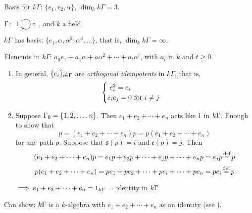 Basis for $k\Gamma$: $\{ e_1, e_2, \alpha\}$, $\dim_kk\Gamma = 3$.

\begin{exam}
$\Gamma\colon \xymatrix{1\ar@(ur,dr)[]^\alpha}$, and $k$ a field.

$k\Gamma$ has basis: $\{e_1, \alpha, \alpha^2, \alpha^3, \ldots\}$,
that is, $\dim_k k\Gamma = \infty$. 

Elements in $k\Gamma$: $a_0e_1 + a_1\alpha + a\alpha^2 + \cdots +
a_t\alpha^t$, with $a_i$ in $k$ and $t\geqslant 0$.  
\end{exam}

\begin{note}
\begin{enumerate}
\item In general, $\{e_i\}_{i \in \Gamma}$ are \emph{orthogonal
    idempotents} in $k\Gamma$, that is, 
	\[ \begin{cases}\text{\ $e_i^2 = e_i$}\notag\\
	\text{$e_ie_j = 0$ for $i\neq j$}\notag
	\end{cases}\]
	
    \item Suppose $\Gamma_0 = \{1,2,\ldots,n\}$. Then $e_1 + e_2 + \cdots + e_n$
      acts like 1 in $k\Gamma$. Enough to show that
      \[p = (e_1 + e_2 + \cdots + e_n)p = p(e_1 + e_2 + \cdots +
        e_n)\] 
      for any path $p$. Suppose that $\mathfrak{s}(p) = i$ and
      $\mathfrak{e}(p) = j$. Then 
      \[(e_1 + e_2 + \cdots + e_n)p = e_1p + e_2p + \cdots + e_jp + \cdots +
      e_np = e_jp \defeq p\]
      \[p(e_1 + e_2 + \cdots + e_n) = pe_1 + pe_2 + \cdots + pe_i + \cdots +
      pe_n = pe_i \defeq p\]
	
    $\implies e_1 + e_2 + \cdots + e_n = 1_{k\Gamma}$ = identity in $k\Gamma$
\end{enumerate}
Can show: $k\Gamma$ is a $k$-algebra with $e_1 + e_2 + \cdots + e_n$ as an
identity (see \cite[page 50]{ARS}). 
\end{note}

